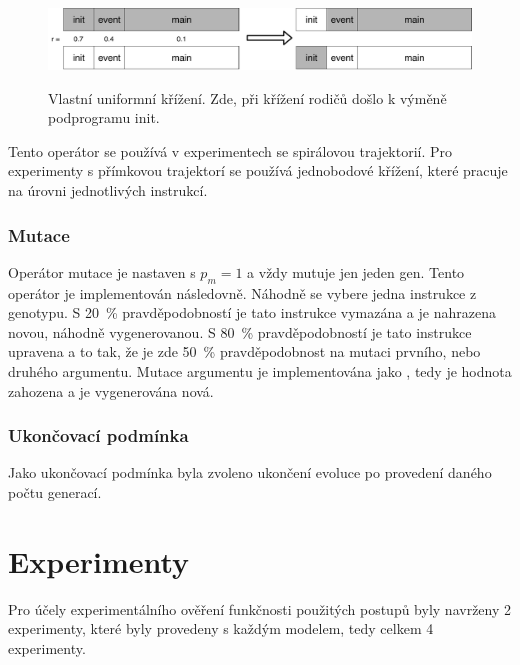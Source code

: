 \begin{figure}[h]
    \centering
    {\includegraphics[width=35em]{obrazky/krizeni_podprogramu.pdf}}
    \caption{
    Vlastní uniformní křížení.
    Zde, při křížení rodičů došlo k výměně podprogramu init.
    }
    \label{fig:krizeni_podprogramu}
\end{figure}

Tento operátor se používá v experimentech se spirálovou trajektorií.
Pro experimenty s přímkovou trajektorí se používá jednobodové křížení, které pracuje na úrovni jednotlivých instrukcí.

\subsection{Mutace}
Operátor mutace je nastaven s $p_m = 1$ a vždy mutuje jen jeden gen.
Tento operátor je implementován následovně.
Náhodně se vybere jedna instrukce z genotypu.
S 20~\% pravděpodobností je tato instrukce vymazána a je nahrazena novou, náhodně vygenerovanou.
S 80~\% pravděpodobností je tato instrukce upravena a to tak, že je zde 50~\% pravděpodobnost na mutaci prvního, nebo druhého argumentu.
Mutace argumentu je implementována jako , tedy je hodnota zahozena a je vygenerována nová.


\subsection{Ukončovací podmínka}
Jako ukončovací podmínka byla zvoleno ukončení evoluce po provedení daného počtu generací.


\chapter{Experimenty}
Pro účely experimentálního ověření funkčnosti použitých postupů byly navrženy 2 experimenty, které byly provedeny s každým modelem, tedy celkem 4 experimenty.

